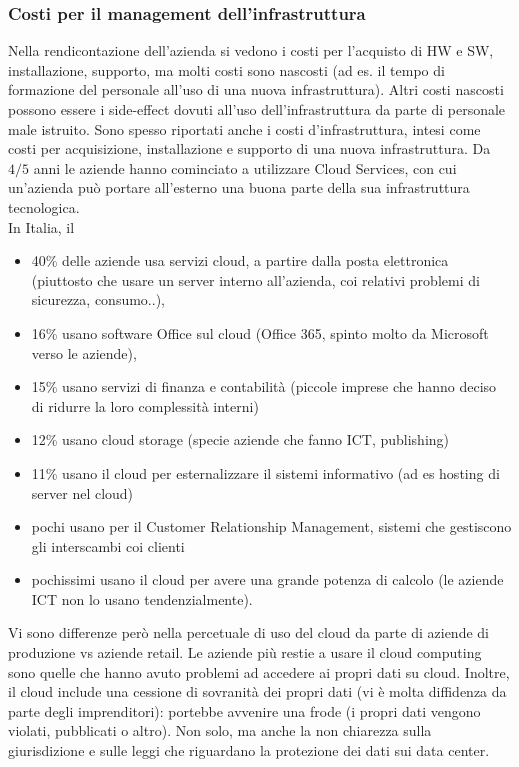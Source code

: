 \subsubsection{Costi per il management dell'infrastruttura}
\label{subs:Costi per il management dell'infrastruttura}
Nella rendicontazione dell'azienda si vedono i costi per l'acquisto di HW e SW, installazione,
supporto, ma molti costi sono nascosti (ad es. il tempo di formazione del personale
all'uso di una nuova infrastruttura). Altri costi nascosti possono essere i side-effect
dovuti all'uso dell'infrastruttura da parte di personale male istruito.
Sono spesso riportati anche i costi d'infrastruttura, intesi come costi per acquisizione, installazione
e supporto di una nuova infrastruttura.
Da $4/5$ anni le aziende hanno cominciato a utilizzare Cloud Services, con cui
un'azienda pu\`o portare all'esterno una buona parte della sua infrastruttura tecnologica.\\
In Italia, il
\begin{itemize}

\item 40\% delle aziende usa servizi cloud, a partire dalla posta elettronica (piuttosto che
usare un server interno all'azienda, coi relativi problemi di sicurezza, consumo..),
\item 16\% usano software Office sul cloud (Office 365, spinto molto da Microsoft verso le aziende),
\item 15\% usano servizi di finanza e contabilit\`a (piccole imprese che hanno deciso di ridurre
la loro complessit\`a interni)
\item 12\% usano cloud storage (specie aziende che fanno ICT, publishing)
\item 11\% usano il cloud per esternalizzare il sistemi informativo (ad es hosting di server
nel cloud)
\item pochi usano per il Customer Relationship Management, sistemi che gestiscono gli interscambi coi clienti
\item pochissimi usano il cloud per avere una grande potenza di calcolo (le aziende ICT non lo usano tendenzialmente).
 \end{itemize}
Vi sono differenze per\`o nella percetuale di uso del cloud da parte di aziende di produzione vs
aziende retail.
Le aziende pi\`u restie a usare il cloud computing sono quelle che hanno avuto problemi ad accedere
ai propri dati su cloud. Inoltre, il cloud include una cessione di sovranit\`a dei propri dati (vi \`e molta
diffidenza da parte degli imprenditori): portebbe avvenire una frode (i propri dati vengono violati, pubblicati o altro).
Non solo, ma anche la non chiarezza sulla giurisdizione e sulle leggi che riguardano la protezione
dei dati sui data center.

